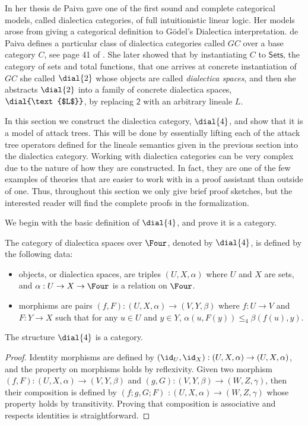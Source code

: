 In her thesis de Paiva \cite{?} gave one of the first sound and
complete categorical models, called dialectica categories, of full
intuitionistic linear logic.  Her models arose from giving a
categorical definition to G\"odel's Dialectica interpretation.  de
Paiva defines a particular class of dialectica categories called $GC$
over a base category $C$, see page 41 of \cite{dePaiva:1988}.  She
later showed that by instantiating $C$ to $\mathsf{Sets}$, the
category of sets and total functions, that one arrives at concrete
instantiation of $GC$ she called $\dial{2}$ whose objects are called
\emph{dialectica spaces}, and then she abstracts $\dial{2}$ into a
family of concrete dialectica spaces, $\dial{\text{$L$}}$, by replacing
$\mathsf{2}$ with an arbitrary lineale $L$.

In this section we construct the dialectica category, $\dial{4}$, and
show that it is a model of attack trees.  This will be done by
essentially lifting each of the attack tree operators defined for the
lineale semantics given in the previous section into the dialectica
category.  Working with dialectica categories can be very complex due
to the nature of how they are constructed.  In fact, they are one of
the few examples of theories that are easier to work with in a proof
assistant than outside of one.  Thus, throughout this section we only
give brief proof sketches, but the interested reader will find the
complete proofs in the formalization.

We begin with the basic definition of $\dial{4}$, and prove it is a
category.
\begin{definition}
  \label{def:dialectica-model}
  The category of dialectica spaces over $\Four$, denoted by
  $\dial{4}$, is defined by the following data:
  \begin{itemize}
  \item objects, or dialectica spaces, are triples $(U, X, \alpha)$
    where $U$ and $X$ are sets, and $\alpha : U \to X \to \Four$ is a
    relation on $\Four$.

  \item morphisms are pairs $(f,F) : (U,X,\alpha) \to (V,Y,\beta)$
    where $f : U \to V$ and $F : Y \to X$ such that for any $u \in U$
    and $y \in Y$, $\alpha(u,F(y)) \leq_4 \beta(f(u),y)$.
  \end{itemize}
\end{definition}

\begin{lemma}
  \label{lemma:dial4_is_a_category}
  The structure $\dial{4}$ is a category.
\end{lemma}
\begin{proof}
  Identity morphisms are defined by $(\id_U, \id_X) : (U , X , \alpha)
  \to (U , X, \alpha)$, and the property on morphisms holds by
  reflexivity.  Given two morphism $(f, F) : (U , X, \alpha) \to (V ,
  Y , \beta)$ and $(g, G) : (V , Y, \beta) \to (W , Z, \gamma)$, then
  their composition is defined by $(f;g, G;F) $ $: (U , X , \alpha) \to
  (W , Z , \gamma)$ whose property holds by transitivity.  Proving
  that composition is associative and respects identities is
  straightforward.
\end{proof}

